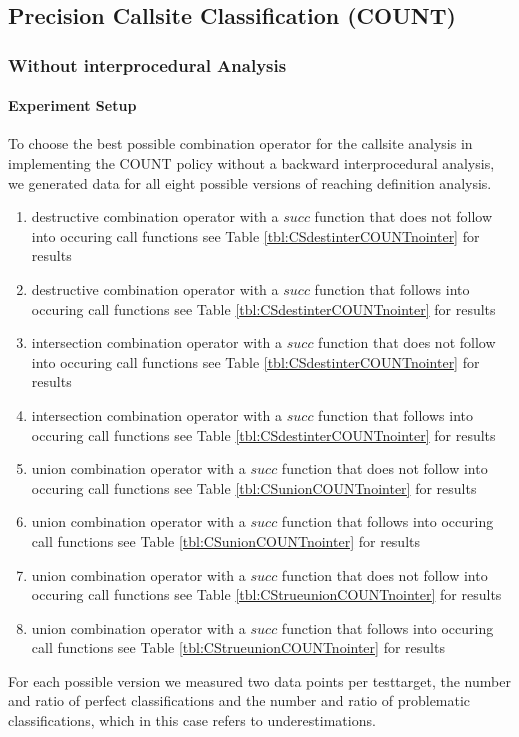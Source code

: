 \newpage

\subsection{Precision Callsite Classification (COUNT)}
\label{subsection:typeshieldprecision}

\subsubsection{Without interprocedural Analysis}

\paragraph{Experiment Setup}
To choose the best possible combination operator for the callsite analysis in implementing the COUNT policy without a backward interprocedural analysis, we generated data for all eight possible versions of reaching definition analysis.
\begin{enumerate}
\item destructive combination operator with a $succ$ function that does not follow into occuring call functions see Table \ref{tbl:CSdestinterCOUNTnointer} for results
\item destructive combination operator with a $succ$ function that follows into occuring call functions see Table \ref{tbl:CSdestinterCOUNTnointer} for results
\item intersection combination operator with a $succ$ function that does not follow into occuring call functions see Table \ref{tbl:CSdestinterCOUNTnointer} for results
\item intersection combination operator with a $succ$ function that follows into occuring call functions see Table \ref{tbl:CSdestinterCOUNTnointer} for results
\item union combination operator with a $succ$ function that does not follow into occuring call functions see Table \ref{tbl:CSunionCOUNTnointer} for results
\item union combination operator with a $succ$ function that follows into occuring call functions see Table \ref{tbl:CSunionCOUNTnointer} for results
\item union combination operator with a $succ$ function that does not follow into occuring call functions see Table \ref{tbl:CStrueunionCOUNTnointer} for results
\item union combination operator with a $succ$ function that follows into occuring call functions see Table \ref{tbl:CStrueunionCOUNTnointer} for results
\end{enumerate}
For each possible version we measured two data points per testtarget, the number and ratio of perfect classifications and the number and ratio of problematic classifications, which in this case refers to underestimations.

